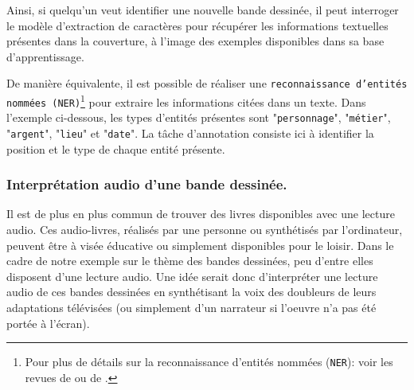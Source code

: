 			Ainsi, si quelqu'un veut identifier une nouvelle bande dessinée, il peut interroger le modèle d'extraction de caractères pour récupérer les informations textuelles présentes dans la couverture, à l'image des exemples disponibles dans sa base d'apprentissage.
			
			\begin{leftBarInformation}
				De manière équivalente, il est possible de réaliser une \texttt{reconnaissance d'entités nommées (\texttt{NER})}\footnote{
					Pour plus de détails sur la reconnaissance d'entités nommées (\texttt{NER}): voir les revues de \cite{goyal-etal:2018:recent-named-entity} ou de \cite{li-etal:2022:survey-deep-learning}.
				} pour extraire les informations citées dans un texte.
				Dans l'exemple ci-dessous, les types d'entités présentes sont "\texttt{personnage}", "\texttt{métier}", "\texttt{argent}", "\texttt{lieu}" et "\texttt{date}".
				La tâche d'annotation consiste ici à identifier la position et le type de chaque entité présente.
				
				\begin{quote}
				\end{quote}
			\end{leftBarInformation}
		
		
		\subsubsection{Interprétation audio d'une bande dessinée.}
		\label{section:2.1.2.D-PRESENTATION-ANNOTATION-EXEMPLES-TRANSCRIPTION}
		
			Il est de plus en plus commun de trouver des livres disponibles avec une lecture audio.
			Ces audio-livres, réalisés par une personne ou synthétisés par l'ordinateur, peuvent être à visée éducative ou simplement disponibles pour le loisir.
			Dans le cadre de notre exemple sur le thème des bandes dessinées, peu d'entre elles disposent d'une lecture audio.
			Une idée serait donc d'interpréter une lecture audio de ces bandes dessinées en synthétisant la voix des doubleurs de leurs adaptations télévisées (ou simplement d'un narrateur si l’oeuvre n'a pas été portée à l'écran).
			
